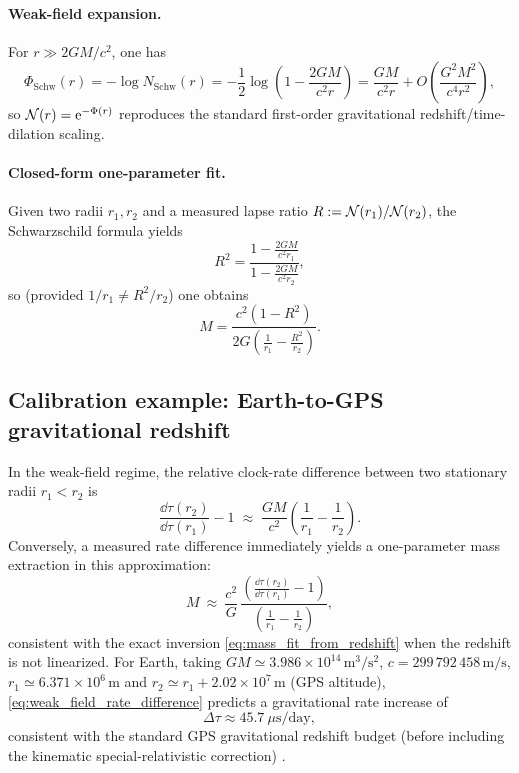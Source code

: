 \paragraph{Weak-field expansion.}
For $r\gg 2GM/c^2$, one has
\[
\Phi_{\mathrm{Schw}}(r)=-\log N_{\mathrm{Schw}}(r)
=-\frac12\log\!\left(1-\frac{2GM}{c^2 r}\right)
=\frac{GM}{c^2 r}+O\!\left(\frac{G^2M^2}{c^4 r^2}\right),
\]
so $\mathcal{N}(r)=\mathrm{e}^{-\Phi(r)}$ reproduces the standard first-order gravitational redshift/time-dilation scaling.

\paragraph{Closed-form one-parameter fit.}
Given two radii $r_1,r_2$ and a measured lapse ratio $R:=\mathcal{N}(r_1)/\mathcal{N}(r_2)$, the Schwarzschild formula yields
\[
R^2=\frac{1-\frac{2GM}{c^2 r_1}}{1-\frac{2GM}{c^2 r_2}},
\]
so (provided $1/r_1\neq R^2/r_2$) one obtains
\begin{equation}
\label{eq:mass_fit_from_redshift}
M=\frac{c^2(1-R^2)}{2G\left(\frac{1}{r_1}-\frac{R^2}{r_2}\right)}.
\end{equation}

\subsection{Calibration example: Earth-to-GPS gravitational redshift}
\label{sec:gps_calibration}

In the weak-field regime, the relative clock-rate difference between two stationary radii $r_1<r_2$ is
\begin{equation}
\label{eq:weak_field_rate_difference}
\frac{\dd \tau(r_2)}{\dd \tau(r_1)}-1\;\approx\;\frac{GM}{c^2}\left(\frac{1}{r_1}-\frac{1}{r_2}\right).
\end{equation}
Conversely, a measured rate difference immediately yields a one-parameter mass extraction in this approximation:
\[
M\ \approx\ \frac{c^2}{G}\,
\frac{\left(\frac{\dd \tau(r_2)}{\dd \tau(r_1)}-1\right)}{\left(\frac{1}{r_1}-\frac{1}{r_2}\right)},
\]
consistent with the exact inversion \eqref{eq:mass_fit_from_redshift} when the redshift is not linearized.
For Earth, taking $GM\simeq 3.986\times 10^{14}\,\mathrm{m^3/s^2}$, $c=299\,792\,458\,\mathrm{m/s}$, $r_1\simeq 6.371\times 10^6\,\mathrm{m}$ and $r_2\simeq r_1+2.02\times 10^7\,\mathrm{m}$ (GPS altitude), \eqref{eq:weak_field_rate_difference} predicts a gravitational rate increase of
\[
\Delta\tau \approx 45.7\ \mu\mathrm{s/day},
\]
consistent with the standard GPS gravitational redshift budget (before including the kinematic special-relativistic correction) \cite{Ashby2003GPS}.

